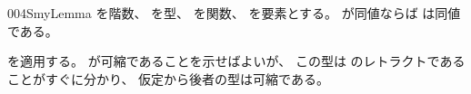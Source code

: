 \documentclass[index]{subfiles}
\begin{document}
\begin{myBlock}{004S}{myLemma}
  を階数、
  を型、
  を関数、
  を要素とする。
  が同値ならば
  は同値である。
\end{myBlock}
\begin{myProof}
  を適用する。
  が可縮であることを示せばよいが、
  この型は
  のレトラクトであることがすぐに分かり、
  仮定から後者の型は可縮である。
\end{myProof}
\end{document}
